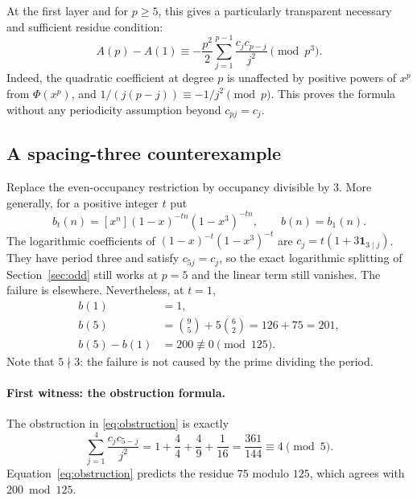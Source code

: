 \documentclass[11pt,a4paper]{article}
\numberwithin{equation}{section}
\theoremstyle{definition}
\theoremstyle{remark}
\begin{document}
At the first layer and for $p\ge5$, this gives a particularly transparent
necessary and sufficient residue condition:
\begin{equation}\label{eq:obstruction}
 A(p)-A(1)\equiv
 -\frac{p^2}{2}\sum_{j=1}^{p-1}\frac{c_jc_{p-j}}{j^2}
 \pmod{p^3}.
\end{equation}
Indeed, the quadratic coefficient at degree $p$ is unaffected by positive
powers of $x^p$ from $\Phi(x^p)$, and
$1/(j(p-j))\equiv-1/j^2\pmod p$. This proves the formula without any
periodicity assumption beyond $c_{pj}=c_j$.

\subsection{A spacing-three counterexample}
Replace the even-occupancy restriction by occupancy divisible by $3$. More
generally, for a positive integer $t$ put
\begin{equation}\label{eq:bn-boundary}
 b_t(n)=[x^n](1-x)^{-tn}(1-x^3)^{-tn},\qquad b(n)=b_1(n).
\end{equation}
The logarithmic coefficients of $(1-x)^{-t}(1-x^3)^{-t}$ are
$c_j=t(1+3\mathbf1_{3\mid j})$. They have period three and satisfy
$c_{5j}=c_j$, so the exact logarithmic splitting of Section~\ref{sec:odd}
still works at $p=5$ and the linear term still vanishes. The failure is
elsewhere. Nevertheless, at $t=1$,
\begin{align*}
 b(1)&=1,\\
 b(5)&=\binom95+5\binom62=126+75=201,\\
 b(5)-b(1)&=200\not\equiv0\pmod{125}.
\end{align*}
Note that $5\nmid3$: the failure is not caused by the prime dividing the
period.

\paragraph{First witness: the obstruction formula.}
The obstruction in \eqref{eq:obstruction} is exactly
\begin{equation}\label{eq:weighted-counterexample}
 \sum_{j=1}^4\frac{c_jc_{5-j}}{j^2}
 =1+\frac44+\frac49+\frac1{16}
 =\frac{361}{144}\equiv4\pmod5.
\end{equation}
Equation~\eqref{eq:obstruction} predicts the residue $75$ modulo $125$,
which agrees with $200\bmod125$.
\end{document}
